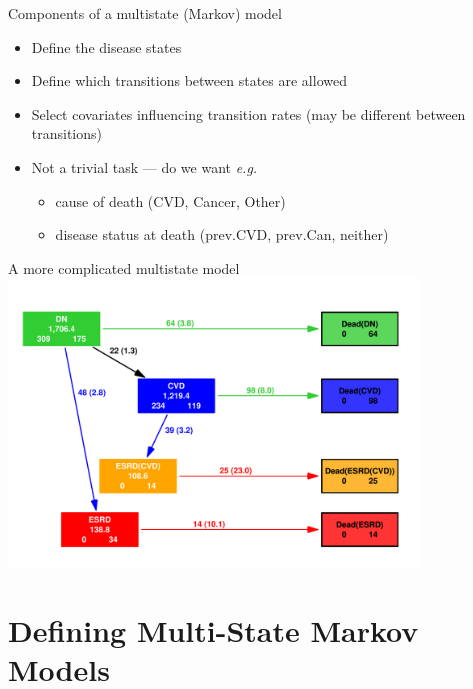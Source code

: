 \begin{frame}{Components of a multistate (Markov) model}
  \begin{itemize}
    \item Define the disease states
    \item Define which transitions between states are allowed
    \item Select covariates influencing transition rates (may be
      different between transitions)
    \item Not a trivial task --- do we want \textit{e.g.}

      \begin{itemize}
      \item cause of death (CVD, Cancer, Other)
      \item disease status at death (prev.CVD, prev.Can, neither)
      \end{itemize}

  \end{itemize}
\end{frame}

\begin{frame}{A more complicated multistate model}
\vspace*{-1em}
\includegraphics[width=0.82\textwidth]{./GbAd-states.pdf}
\end{frame}

\section{Defining Multi-State Markov Models}

